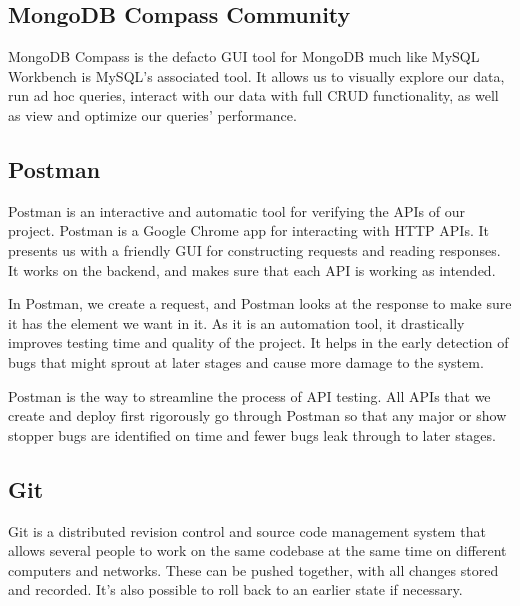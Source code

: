 \subsection{MongoDB Compass Community}
MongoDB Compass is the defacto GUI tool for MongoDB much like MySQL Workbench is MySQL’s associated tool. It allows us to visually explore our data, run ad hoc queries, interact with our data with full CRUD functionality, as well as view and optimize our queries’ performance.



\subsection{Postman}
Postman is an interactive and automatic tool for verifying the APIs of our project. Postman is a Google Chrome app for interacting with HTTP APIs. It presents us with a friendly GUI for constructing requests and reading responses. It works on the backend, and makes sure that each API is working as intended.

In Postman, we create a request, and Postman looks at the response to make sure it has the element we want in it. As it is an automation tool, it drastically improves testing time and quality of the project. It helps in the early detection of bugs that might sprout at later stages and cause more damage to the system.

Postman is the way to streamline the process of API testing. All APIs that we create and deploy first rigorously go through Postman so that any major or show stopper bugs are identified on time and fewer bugs leak through to later stages.



\subsection{Git}
Git is a distributed revision control and source code management system that
allows several people to work on the same codebase at the same time on different
computers and networks. These can be pushed together, with all changes stored and
recorded. It’s also possible to roll back to an earlier state if necessary.

